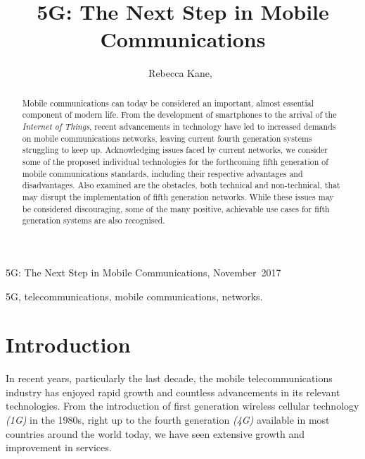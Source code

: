 \documentclass[journal]{IEEEtran}
\begin{document}
%
{5G: The Next Step in Mobile Communications, November~2017}

\title{5G: The Next Step in Mobile Communications}
\author{Rebecca Kane,~%
}

\maketitle

\begin{abstract}
Mobile communications can today be considered an important, almost essential component of modern life. From the development of smartphones to the arrival of the \textit{Internet of Things}, recent advancements in technology have led to increased demands on mobile communications networks, leaving current fourth generation systems struggling to keep up. Acknowledging issues faced by current networks, we consider some of the proposed individual technologies for the forthcoming fifth generation of mobile communications standards, including their respective advantages and disadvantages. Also examined are the obstacles, both technical and non-technical, that may disrupt the implementation of fifth generation networks. While these issues may be considered discouraging, some of the many positive, achievable use cases for fifth generation systems are also recognised. 

\end{abstract}
\begin{IEEEkeywords}
5G, telecommunications, mobile communications, networks.
\end{IEEEkeywords}

\section{Introduction}
In recent years, particularly the last decade, the mobile telecommunications industry has enjoyed rapid growth and countless advancements in its relevant technologies. From the introduction of first generation wireless cellular technology \textit{(1G)} in the 1980s, right up to the fourth generation \textit{(4G)} available in most countries around the world today, we have seen extensive growth and improvement in services.
\end{document}
